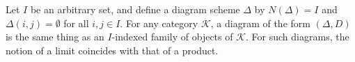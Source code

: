 Let $I$ be an arbitrary set, and define a diagram scheme $\Delta$ by $N(\Delta) = I$ and $\Delta(i, j) = \emptyset$ for all $i, j \in I$. For any category $\mathcal{K}$, a diagram of the form $(\Delta, D)$ is the same thing as an $I$-indexed family of objects of $\mathcal{K}$. For such diagrams, the notion of a limit coincides with that of a product.

